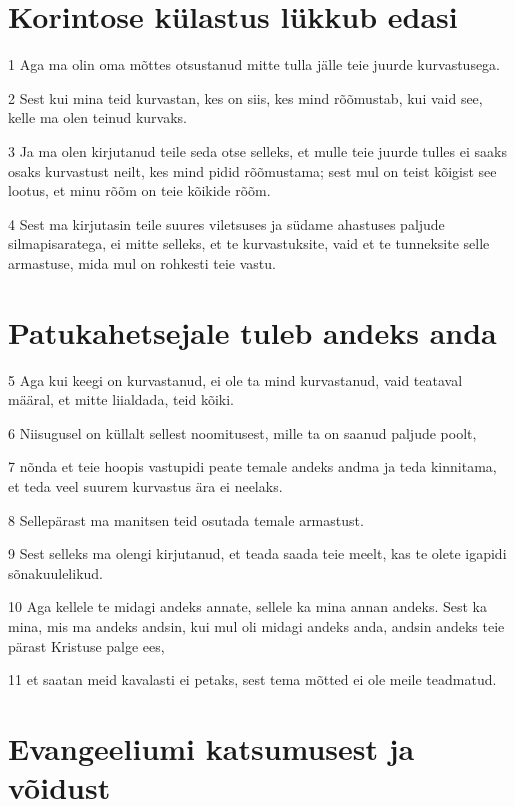 \section*{Korintose külastus lükkub edasi}

\par 1 Aga ma olin oma mõttes otsustanud mitte tulla jälle teie juurde kurvastusega.
\par 2 Sest kui mina teid kurvastan, kes on siis, kes mind rõõmustab, kui vaid see, kelle ma olen teinud kurvaks.
\par 3 Ja ma olen kirjutanud teile seda otse selleks, et mulle teie juurde tulles ei saaks osaks kurvastust neilt, kes mind pidid rõõmustama; sest mul on teist kõigist see lootus, et minu rõõm on teie kõikide rõõm.
\par 4 Sest ma kirjutasin teile suures viletsuses ja südame ahastuses paljude silmapisaratega, ei mitte selleks, et te kurvastuksite, vaid et te tunneksite selle armastuse, mida mul on rohkesti teie vastu.

\section*{Patukahetsejale tuleb andeks anda}

\par 5 Aga kui keegi on kurvastanud, ei ole ta mind kurvastanud, vaid teataval määral, et mitte liialdada, teid kõiki.
\par 6 Niisugusel on küllalt sellest noomitusest, mille ta on saanud paljude poolt,
\par 7 nõnda et teie hoopis vastupidi peate temale andeks andma ja teda kinnitama, et teda veel suurem kurvastus ära ei neelaks.
\par 8 Sellepärast ma manitsen teid osutada temale armastust.
\par 9 Sest selleks ma olengi kirjutanud, et teada saada teie meelt, kas te olete igapidi sõnakuulelikud.
\par 10 Aga kellele te midagi andeks annate, sellele ka mina annan andeks. Sest ka mina, mis ma andeks andsin, kui mul oli midagi andeks anda, andsin andeks teie pärast Kristuse palge ees,
\par 11 et saatan meid kavalasti ei petaks, sest tema mõtted ei ole meile teadmatud.

\section*{Evangeeliumi katsumusest ja võidust}

